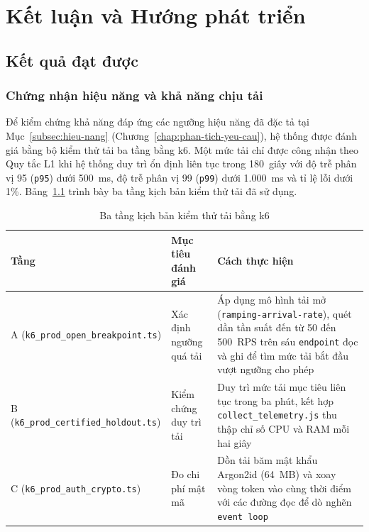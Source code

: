 \chapter{Kết luận và Hướng phát triển}
\label{chap:ket-luan}

\section{Kết quả đạt được}
\label{sec:ket-qua-dat-duoc}

\subsection{Chứng nhận hiệu năng và khả năng chịu tải}
\label{subsec:ket-qua-hieu-nang}

Để kiểm chứng khả năng đáp ứng các ngưỡng hiệu năng đã đặc tả tại Mục~\ref{subsec:hieu-nang} (Chương~\ref{chap:phan-tich-yeu-cau}), hệ thống được đánh giá bằng bộ kiểm thử tải ba tầng bằng k6. Một mức tải chỉ được công nhận theo Quy tắc L1 khi hệ thống duy trì ổn định liên tục trong 180~giây với độ trễ phân vị 95 (\texttt{p95}) dưới 500~ms, độ trễ phân vị 99 (\texttt{p99}) dưới 1.000~ms và tỉ lệ lỗi dưới 1\%. Bảng~\ref{tab:kich-ban-kiem-thu-tai} trình bày ba tầng kịch bản kiểm thử tải đã sử dụng.

\begin{table}[htbp]
\centering
\caption{Ba tầng kịch bản kiểm thử tải bằng k6}
\label{tab:kich-ban-kiem-thu-tai}
\small
\begin{tabularx}{\textwidth}{
  >{\raggedright\arraybackslash}p{4.3cm}
  >{\raggedright\arraybackslash}p{3.2cm}
  >{\raggedright\arraybackslash}X
}
\toprule
\textbf{Tầng} & \textbf{Mục tiêu đánh giá} & \textbf{Cách thực hiện} \\
\midrule
A (\texttt{k6\_prod\_open\_\allowbreak{}breakpoint.ts}) & Xác định ngưỡng quá tải & Áp dụng mô hình tải mở (\texttt{ramping-\allowbreak{}arrival-rate}), quét dần tần suất đến từ 50 đến 500~RPS trên sáu \texttt{endpoint} đọc và ghi để tìm mức tải bắt đầu vượt ngưỡng cho phép \\
\midrule
B (\texttt{k6\_prod\_certified\_\allowbreak{}holdout.ts}) & Kiểm chứng duy trì tải & Duy trì mức tải mục tiêu liên tục trong ba phút, kết hợp \texttt{collect\_\allowbreak{}telemetry.js} thu thập chỉ số CPU và RAM mỗi hai giây \\
\midrule
C (\texttt{k6\_prod\_auth\_\allowbreak{}crypto.ts}) & Đo chi phí mật mã & Dồn tải băm mật khẩu Argon2id (64~MB) và xoay vòng token vào cùng thời điểm với các đường đọc để dò nghẽn \texttt{event loop} \\
\bottomrule
\end{tabularx}
\end{table}

